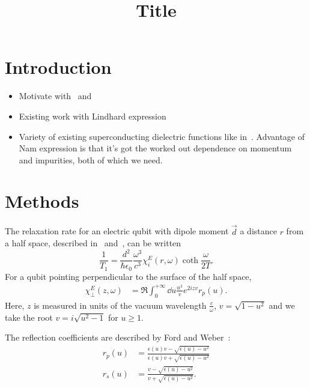 \documentclass{article}
\title{Title}
\begin{document}
\maketitle

\section{Introduction \label{sec:intro}}
\begin{itemize}
	\item Motivate with~\cite{Tenberg2019} and~\cite{Kolkowitz2015}
	\item Existing work with Lindhard expression~\cite{QubitRelax}
	\item Variety of existing superconducting dielectric functions like in~\cite{AGD, llv9, Zimmermann1991, Mattis, Tinkham}.
	Advantage of Nam expression\cite{Nam1967} is that it's got the worked out dependence on momentum and impurities, both of which we need.
\end{itemize}
\section{Methods \label{sec:methods}}

	The relaxation rate for an electric qubit with dipole moment $\vec{d}$ a distance $r$ from a half space, described in~\cite{Henkel1999} and~\cite{QubitRelax}, can be written
	\begin{equation}
		\frac{1}{T_1} = \frac{d^2}{\hbar \epsilon_0} \frac{\omega^3}{c^3} \chi_{i}^{E}(r, \omega) \coth\frac{\omega}{2 T}.
	\end{equation}
	For a qubit pointing perpendicular to the surface of the half space,
	\begin{align}
		\chi_\perp^E(z, \omega) &= \Re \int_0^{+\infty} \dd{u} \frac{u^3}{v} e^{2 i z v} r_p(u).
	\end{align}
	Here, $z$ is measured in units of the vacuum wavelength $\frac{c}{\omega}$, $v = \sqrt{1 - u^2}$ and we take the root $v = i \sqrt{u^2 - 1}$ for $u \geq 1$.

	The reflection coefficients are described by Ford and Weber~\cite{Ford1984}:
	\begin{align}
		r_p(u) &= \frac{\epsilon(u) v - \sqrt{\epsilon(u) - u^2}}{\epsilon(u) v + \sqrt{\epsilon(u) - u^2}} \\
		r_s(u) &= \frac{v - \sqrt{\epsilon(u) - u^2}}{v + \sqrt{\epsilon(u) - u^2}}.
	\end{align}
\end{document}
